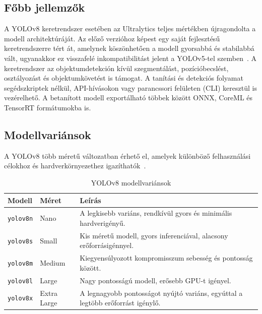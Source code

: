     \subsection{Főbb jellemzők}

        A YOLOv8 keretrendszer esetében az Ultralytics teljes mértékben újragondolta a modell architektúráját. Az előző
        verzióhoz képest egy saját fejlesztésű keretrendszerre tért át, amelynek köszönhetően a modell gyorsabbá és
        stabilabbá vált, ugyanakkor ez visszafelé inkompatibilitást jelent a YOLOv5-tel szemben~\cite{yolov8}.
        A keretrendszer az objektumdetekción kívül szegmentálást, pozícióbecslést, osztályozást és objektumkövetést is
        támogat. A tanítási és detekciós folyamat segédszkriptek nélkül, API-hívásokon vagy parancssori felületen (CLI)
        keresztül is vezérelhető. A betanított modell exportálható többek között ONNX, CoreML és TensorRT formátumokba is.

    \subsection{Modellvariánsok}

    A YOLOv8 több méretű változatban érhető el, amelyek különböző felhasználási célokhoz és hardverkörnyezethez igazíthatók~\cite{yolov8}.

    \begin{table}[H]
    \centering
    \caption{YOLOv8 modellvariánsok}
    \label{tab:yolo_variansok}
    \renewcommand{\arraystretch}{1.4}
    \begin{tabular}{|l|l|p{}|}
        \hline
        \textbf{Modell} & \textbf{Méret} & \textbf{Leírás} \\
        \hline
        \texttt{yolov8n} & Nano       & A legkisebb variáns, rendkívül gyors és minimális hardverigényű. \\
        \hline
        \texttt{yolov8s} & Small      & Kis méretű modell, gyors inferenciával, alacsony erőforrásigénnyel. \\
        \hline
        \texttt{yolov8m} & Medium     & Kiegyensúlyozott kompromisszum sebesség és pontosság között. \\
        \hline
        \texttt{yolov8l} & Large      & Nagy pontosságú modell, erősebb GPU-t igényel. \\
        \hline
        \texttt{yolov8x} & Extra Large & A legnagyobb pontosságot nyújtó variáns, egyúttal a legtöbb erőforrást igénylő. \\
        \hline
    \end{tabular}
    \end{table}


